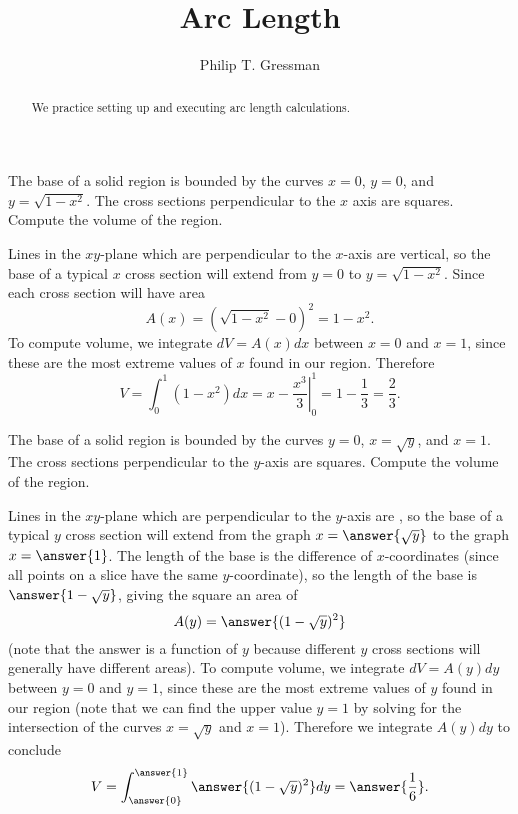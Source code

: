 \documentclass{ximera}
\title{Arc Length}
\author{Philip T. Gressman}
\begin{document}
\begin{abstract}
We practice setting up and executing arc length calculations.
\end{abstract}
\maketitle

\begin{example}
The base of a solid region is bounded by the curves $x = 0$, $y= 0$, and $y = \sqrt{1-x^2}$. The cross sections perpendicular to the $x$ axis are squares. Compute the volume of the region.
\begin{solution}
Lines in the $xy$-plane which are perpendicular to the $x$-axis are vertical, so the base of a typical $x$ cross section will extend from $y=0$ to $y = \sqrt{1-x^2}$. Since each cross section will have area
\[ A(x) = \left( \sqrt{1-x^2} - 0 \right)^2 = 1-x^2. \]
To compute volume, we integrate $dV = A(x) dx$ between $x=0$ and $x=1$, since these are the most extreme values of $x$ found in our region. Therefore
\[ V = \int_0^1 ( 1 -x^2) dx = \left. x - \frac{x^3}{3} \right|_0^1 = 1 - \frac{1}{3} = \frac{2}{3}. \]
\end{solution}
\end{example}

\begin{example}
The base of a solid region is bounded by the curves $y = 0$, $x = \sqrt{y}$, and $x = 1$. The cross sections perpendicular to the $y$-axis are squares. Compute the volume of the region.
\begin{solution}
Lines in the $xy$-plane which are perpendicular to the $y$-axis are , so the base of a typical $y$ cross section will extend from the graph $x=\answer{\sqrt{y}}$ to the graph $x = \answer{1}$. The length of the base is the difference of $x$-coordinates (since all points on a slice have the same $y$-coordinate), so the length of the base is $\answer{1 - \sqrt{y}}$, giving the square an area of 
\[ A(y) = \answer{(1-\sqrt{y})^2} \]
(note that the answer is a function of $y$ because different $y$ cross sections will generally have different areas).
To compute volume, we integrate $dV = A(y) dy$ between $y=0$ and $y=1$, since these are the most extreme values of $y$ found in our region (note that we can find the upper value $y=1$ by solving for the intersection of the curves $x = \sqrt{y}$ and $x=1$). Therefore we integrate $A(y) dy$ to conclude
\[ V = \int_{\answer{0}}^{\answer{1}} \answer{(1-\sqrt{y})^2} dy = \answer{\frac{1}{6}}. \]
\end{solution}
\end{example}
\end{document}
